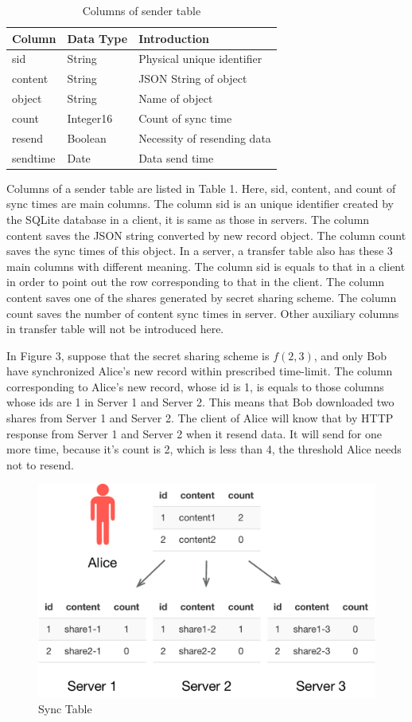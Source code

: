\documentclass[twocolumn,10pt]{article}
\begin{document}
\begin{table}[tbp]
	\centering  
	\begin{tabular}{lll}  
		\hline
		Column &Data Type & Introduction\\ 
		\hline  
		sid &String & Physical unique identifier\\
		content & String & JSON String of object\\ 
		object & String & Name of object\\
		count & Integer16 & Count of sync time\\
		resend & Boolean &Necessity of resending data \\
		sendtime & Date & Data send time\\
		\hline
	\end{tabular}
	\caption{Columns of sender table}
\end{table}

Columns of a sender table are listed in Table 1. Here, sid, content, and count of sync times are main columns. The column  sid is an unique identifier created by the SQLite database in a client, it is same as those in servers. The column content saves the JSON string converted by new record object. The column count saves the sync times of this object. In a server, a transfer table also has these 3 main columns with different meaning. The column sid is equals to that in a client in order to point out the row corresponding to that in the client. The column content saves one of the shares generated by secret sharing scheme. The column count saves the number of content sync times in server. Other auxiliary columns in transfer table will not be introduced here.

In Figure 3, suppose that the secret sharing scheme is $f(2, 3)$, and only Bob have synchronized Alice's new record within prescribed time-limit. The column corresponding to Alice's new record, whose id is 1, is equals to those columns whose ids are 1 in Server 1 and Server 2. This means that Bob downloaded two shares from Server 1 and Server 2. The client of Alice will know that by HTTP response from Server 1 and Server 2 when it resend data. It will send for one more time, because it's count is 2, which is less than 4, the threshold Alice needs not to resend.

\begin{figure}[t]
\centering
\includegraphics[scale=0.4]{sync_table}
\caption{Sync Table}
\end{figure}
\end{document}

